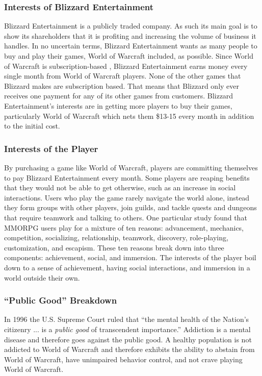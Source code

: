\documentclass[11pt]{article}
\begin{document}
\begin{multicols}{2}
\subsubsection{Interests of Blizzard Entertainment}
Blizzard Entertainment is a publicly traded company. \cite{BlizzStock} As such its main goal is to show its shareholders that it is profiting and increasing the volume of business it handles. In no uncertain terms, Blizzard Entertainment wants as many people to buy and play their games, World of Warcraft included, as possible. Since World of Warcraft is subscription-based \cite{WoWSubscription}, Blizzard Entertainment earns money every single month from World of Warcraft players. None of the other games that Blizzard makes are subscription based. \cite{BlizzGameList} That means that Blizzard only ever receives one payment for any of its other games from customers. Blizzard Entertainment's interests are in getting more players to buy their games, particularly World of Warcraft which nets them \$13-15 every month in addition to the initial cost. \cite{WoWSubPlans}

\subsubsection{Interests of the Player}
By purchasing a game like World of Warcraft, players are committing themselves to pay Blizzard Entertainment every month. \cite{WoWSubscription} Some players are reaping benefits that they would not be able to get otherwise, such as an increase in social interactions. \cite{IsThereEvidenceOfInternetAddiction} Users who play the game rarely navigate the world alone, instead they form groups with other players, join guilds, and tackle quests and dungeons that require teamwork and talking to others.
One particular study found that MMORPG users play for a mixture of ten reasons: advancement, mechanics, competition, socializing, relationship, teamwork, discovery, role-playing, customization, and escapism. These ten reasons break down into three components: achievement, social, and immersion. \cite{PlayerMotivations} The interests of the player boil down to a sense of achievement, having social interactions, and immersion in a world outside their own.

\subsubsection{``Public Good'' Breakdown}
In 1996 the U.S. Supreme Court ruled that ``the mental health of the Nation's citizenry ... is a \emph{public good} of transcendent importance.'' \cite{SupremeCourtPublicGood} Addiction is a mental disease \cite{DefinitionOfAddiction} and therefore goes against the public good. A healthy population is not addicted to World of Warcraft and therefore exhibits the ability to abstain from World of Warcraft, have unimpaired behavior control, and not crave playing World of Warcraft.


\end{multicols}
\end{document}
